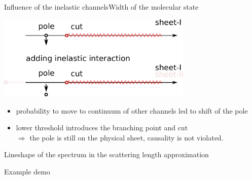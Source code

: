 \documentclass[aspectratio=169]{beamer}
\begin{document}
\begin{frame}{Influence of the inelastic channels}{Width of the molecular state}
    \begin{center}
        \includegraphics[width=0.7\textwidth]{figs/PcJPAC/pole_cut_inelastic.pdf}
    \end{center}
    \begin{itemize}
        \item probability to move to continuum of other channels led to shift of the pole
        \item lower threshold introduces the branching point and cut\\
        $\Rightarrow$ the pole is still on the physical sheet, causality is not violated.
    \end{itemize}
\end{frame}

\begin{frame}{Lineshape of the spectrum in the scattering length approximation}
\begin{center}
    \Huge Example demo\\[1cm]
    \qquad
\end{center}
\end{frame}
\end{document}
